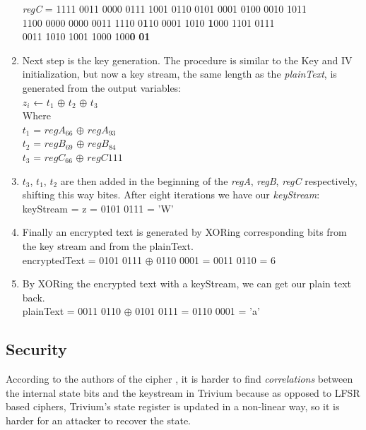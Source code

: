 \begin{enumerate}
{		\emph{regC} = 1111 0011 0000 0111 1001 0110 0101 0001 0100 0010 1011 \\ 
		\indent\hspace{1.6cm}1100 0000 0000 0011 1110 0\textbf{1}10 0001 1010 \textbf{1}000 1101 0111 \\
		\indent\hspace{1.6cm}0011 1010 1001 1000 100\textbf{0} \textbf{01}
	}
	\item Next step is the key generation. The procedure is similar to the Key and IV initialization, but now a key stream, the same length as the \emph{plainText}, is generated from the output variables:\\
	{\selectfont
		$z_i$ ← $t_1$ $\oplus$ $t_2$ $\oplus$ $t_3$\\
		Where \\
		$t_1$ = $regA_{66}$ $\oplus$ $regA_{93}$\\
		$t_2$ = $regB_{69}$ $\oplus$ $regB_{84}$\\
		$t_3$ = $regC_{66}$ $\oplus$ $regC{111}$
	}
	\item \emph{$t_3$}, \emph{$t_1$}, \emph{$t_2$} are then added in the beginning of the \emph{regA}, \emph{regB}, \emph{regC} respectively, shifting this way bites. After eight iterations we have our \emph{keyStream}:\\
	{\selectfont
		keyStream  = z = 0101 0111 = 'W'
	}
	\item Finally an encrypted text is generated by XORing corresponding bits from the key stream and from the plainText.\\
	{\selectfont
		encryptedText = 0101 0111 $\oplus$ 0110 0001 = 0011 0110 = 6
	}
	\item By XORing the encrypted text with a keyStream, we can get our plain text back.\\
	{\selectfont
		plainText = 0011 0110 $\oplus$ 0101 0111 = 0110 0001 = 'a'
	}
\end{enumerate}

\vspace{0.5cm}

\subsection{Security}
According to the authors of the cipher \cite{canniere2008trivium}, it is harder to find \emph{correlations} between the internal state bits and the keystream in Trivium because as opposed to LFSR based ciphers, Trivium's state register is updated in a non-linear way, so it is harder for an attacker to recover the state.\\

